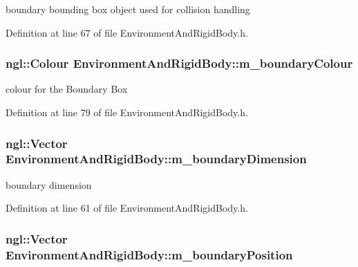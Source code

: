 boundary bounding box object used for collision handling 



Definition at line 67 of file EnvironmentAndRigidBody.h.

\hypertarget{class_environment_and_rigid_body_a432ab35af420a258e44e77487c2abeb3}{
\subsubsection[{m\_\-boundaryColour}]{\setlength{\rightskip}{0pt plus 5cm}ngl::Colour {\bf EnvironmentAndRigidBody::m\_\-boundaryColour}}}
\label{class_environment_and_rigid_body_a432ab35af420a258e44e77487c2abeb3}


colour for the Boundary Box 



Definition at line 79 of file EnvironmentAndRigidBody.h.

\hypertarget{class_environment_and_rigid_body_aadb7dcf7549b62ed3dd79534ca552994}{
\subsubsection[{m\_\-boundaryDimension}]{\setlength{\rightskip}{0pt plus 5cm}ngl::Vector {\bf EnvironmentAndRigidBody::m\_\-boundaryDimension}}}
\label{class_environment_and_rigid_body_aadb7dcf7549b62ed3dd79534ca552994}


boundary dimension 



Definition at line 61 of file EnvironmentAndRigidBody.h.

\hypertarget{class_environment_and_rigid_body_a5508f26bcf4f0cd9bf0db1694f015468}{
\subsubsection[{m\_\-boundaryPosition}]{\setlength{\rightskip}{0pt plus 5cm}ngl::Vector {\bf EnvironmentAndRigidBody::m\_\-boundaryPosition}}}
\label{class_environment_and_rigid_body_a5508f26bcf4f0cd9bf0db1694f015468}



